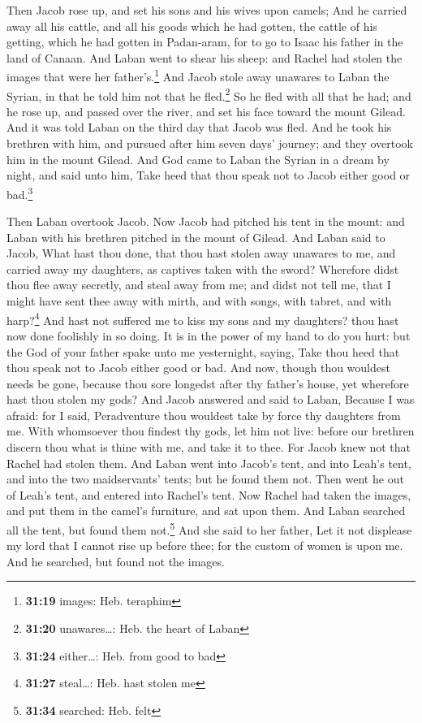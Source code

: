  Then Jacob rose up, and set his sons and his wives upon
camels;  And he carried away all his cattle, and all his
goods which he had gotten, the cattle of his getting, which he had
gotten in Padan-aram, for to go to Isaac his father in the land of
Canaan.  And Laban went to shear his sheep: and Rachel
had stolen the images that were her father's.\footnote{\textbf{31:19}
  images: Heb. teraphim}  And Jacob stole away unawares
to Laban the Syrian, in that he told him not that he fled.\footnote{\textbf{31:20}
  unawares\ldots: Heb. the heart of Laban}  So he fled
with all that he had; and he rose up, and passed over the river, and set
his face toward the mount Gilead.  And it was told Laban
on the third day that Jacob was fled.  And he took his
brethren with him, and pursued after him seven days' journey; and they
overtook him in the mount Gilead.  And God came to Laban
the Syrian in a dream by night, and said unto him, Take heed that thou
speak not to Jacob either good or bad.\footnote{\textbf{31:24}
  either\ldots: Heb. from good to bad}

 Then Laban overtook Jacob. Now Jacob had pitched his
tent in the mount: and Laban with his brethren pitched in the mount of
Gilead.  And Laban said to Jacob, What hast thou done,
that thou hast stolen away unawares to me, and carried away my
daughters, as captives taken with the sword?  Wherefore
didst thou flee away secretly, and steal away from me; and didst not
tell me, that I might have sent thee away with mirth, and with songs,
with tabret, and with harp?\footnote{\textbf{31:27} steal\ldots: Heb.
  hast stolen me}  And hast not suffered me to kiss my
sons and my daughters? thou hast now done foolishly in so doing.
 It is in the power of my hand to do you hurt: but the
God of your father spake unto me yesternight, saying, Take thou heed
that thou speak not to Jacob either good or bad.  And
now, though thou wouldest needs be gone, because thou sore longedst
after thy father's house, yet wherefore hast thou stolen my gods?
 And Jacob answered and said to Laban, Because I was
afraid: for I said, Peradventure thou wouldest take by force thy
daughters from me.  With whomsoever thou findest thy
gods, let him not live: before our brethren discern thou what is thine
with me, and take it to thee. For Jacob knew not that Rachel had stolen
them.  And Laban went into Jacob's tent, and into Leah's
tent, and into the two maidservants' tents; but he found them not. Then
went he out of Leah's tent, and entered into Rachel's tent.
 Now Rachel had taken the images, and put them in the
camel's furniture, and sat upon them. And Laban searched all the tent,
but found them not.\footnote{\textbf{31:34} searched: Heb. felt}
 And she said to her father, Let it not displease my lord
that I cannot rise up before thee; for the custom of women is upon me.
And he searched, but found not the images.

